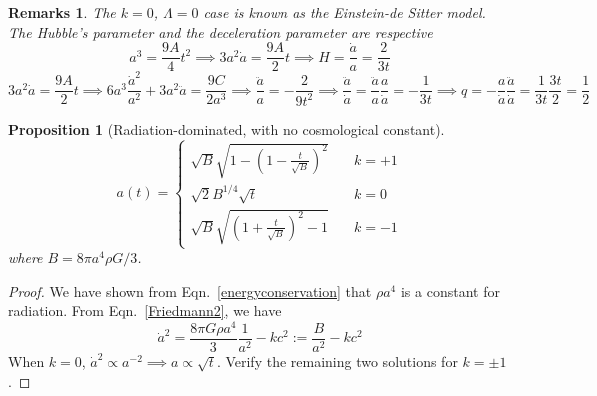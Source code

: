 \documentclass[a4paper]{article}
\newtheorem{remarks}{Remarks}[section]
\theoremstyle{new}
\newtheorem{prop}{Proposition}[section]
\begin{document}
\begin{remarks}
The $k=0$, $\Lambda=0$ case is known as the Einstein-de Sitter model. The Hubble's parameter and the deceleration parameter are respective
$$a^3=\frac{9A}{4}t^2\implies3a^2\dot{a}=\frac{9A}{2}t\implies H=\frac{\dot{a}}{a}=\frac{2}{3t}$$
$$3a^2\dot{a}=\frac{9A}{2}t\implies 6a^3\frac{\dot{a}^2}{a^2}+3a^2\ddot{a}=\frac{9C}{2a^3}\implies\frac{\ddot{a}}{a}=-\frac{2}{9t^2}\implies\frac{\ddot{a}}{\dot{a}}=\frac{\ddot{a}}{a}\frac{a}{\dot{a}}=-\frac{1}{3t}\implies q=-\frac{a}{\dot{a}}\frac{\ddot{a}}{\dot{a}}=\frac{1}{3t}\frac{3t}{2}=\frac{1}{2}$$
\end{remarks}

\begin{prop}[Radiation-dominated, with no cosmological constant]
$$a(t)=\begin{cases}
\sqrt{B}\sqrt{1-(1-\frac{t}{\sqrt{B}})^2}&\quad k=+1\\
\sqrt{2}B^{1/4}\sqrt{t}&\quad k=0\\
\sqrt{B}\sqrt{(1+\frac{t}{\sqrt{B}})^2-1}&\quad k=-1
\end{cases}$$
where $B=8\pi a^4\rho G/3$.
\end{prop}
\begin{proof}
We have shown from Eqn.~\ref{energyconservation} that $\rho a^4$ is a constant for radiation. From Eqn.~\ref{Friedmann2}, we have
$$\dot{a}^2=\frac{8\pi G\rho a^4}{3}\frac{1}{a^2}-kc^2:=\frac{B}{a^2}-kc^2$$
When $k=0$, $\dot{a}^2\propto a^{-2}\implies a\propto\sqrt{t}$. Verify the remaining two solutions for $k=\pm1$.
\end{proof}
\end{document}
